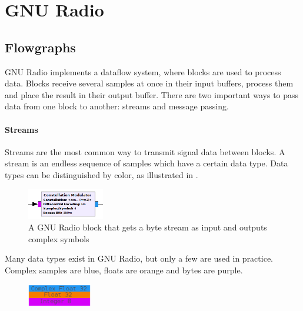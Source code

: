 \section{GNU Radio}


\subsection{Flowgraphs}

GNU Radio implements a dataflow system, where blocks are used to process data. Blocks receive several samples at once in their input buffers, process them and place the result in their output buffer. There are two important ways to pass data from one block to another: streams and message passing.
\paragraph*{Streams}
Streams are the most common way to transmit signal data between blocks. A stream is an endless sequence of samples which have a certain data type. Data types can be distinguished by color, as illustrated in .

\begin{figure}[H]
    \centering
    \includegraphics[width=0.3\textwidth]{img_other/gnuradio_block.png}
    \caption{{A GNU Radio block that gets a byte stream as input and outputs complex symbols} }
    \label{fig:gnuradio_block}
\end{figure}

Many data types exist in GNU Radio, but only a few are used in practice. Complex samples are blue, floats are orange and bytes are purple.
\begin{figure}[H]
    \centering
    \includegraphics[width=0.25\textwidth]{img_other/datatypes.png}
    \label{fig:datatypes}
\end{figure}


